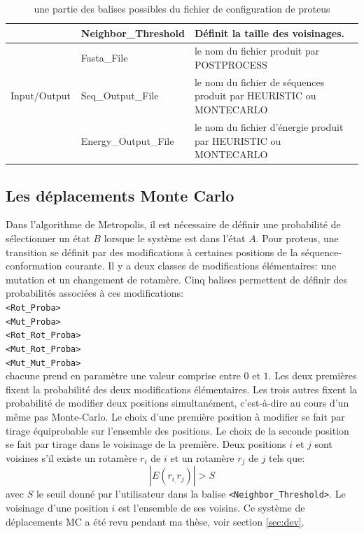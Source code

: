 \begin{table}[!htbp]
\begin{tabular}{|p{0.2\linewidth}|p{0.32\linewidth}|p{0.48\linewidth}|}
                         & Neighbor\_Threshold & Définit la taille des voisinages.\\   \hline
        
                         & Fasta\_File & le nom du fichier produit par POSTPROCESS\\    \cline{2-3}             
        Input/Output     & Seq\_Output\_File & le nom  du fichier de séquences produit par HEURISTIC ou MONTECARLO\\    \cline{2-3}             
                         & Energy\_Output\_File & le nom du fichier d'énergie produit par HEURISTIC ou MONTECARLO\\   \hline              

      \end{tabular} 

      \caption{une partie des balises possibles du fichier de configuration de proteus}      

      \label{tab:balise_proteus}

  \end{table}

\subsection{Les déplacements Monte Carlo}
\label{sub:MC_move}
Dans l'algorithme de Metropolis, il est nécessaire de définir une probabilité de sélectionner un état $B$ lorsque le système est dans l'état $A$. Pour proteus, une transition se définit par des modifications à certaines positions de la séquence-conformation courante. Il y a deux classes de modifications élémentaires: une mutation et un changement de rotamère. Cinq balises permettent de définir des probabilités associées à ces modifications: \\
\verb!<Rot_Proba>! \\
\verb!<Mut_Proba>! \\
\verb!<Rot_Rot_Proba>! \\
\verb!<Mut_Rot_Proba>! \\
\verb!<Mut_Mut_Proba>!  \\
chacune prend en paramètre une valeur comprise entre $0$ et $1$. Les deux premières fixent la probabilité des deux modifications élémentaires. Les trois autres fixent la probabilité de modifier deux positions simultanément, c'est-à-dire au cours d'un même pas Monte-Carlo. Le choix d'une première position à modifier se fait par tirage équiprobable sur l'ensemble des positions. Le choix de la seconde position se fait par tirage dans le voisinage de la première. Deux positions $i$ et $j$ sont voisines s'il existe un rotamère $r_i$ de $i$ et un rotamère $r_j$ de $j$ tels que:
\begin{displaymath}
  \label{eq:voisin}
 | E(r_i_,r_j) | > S
\end{displaymath} 
avec $S$ le seuil donné par l'utilisateur dans la balise \verb!<Neighbor_Threshold>!. Le voisinage d'une position $i$ est l'ensemble de ses voisins. Ce système de déplacements MC a été revu pendant ma thèse, voir section \vref{sec:dev}.

